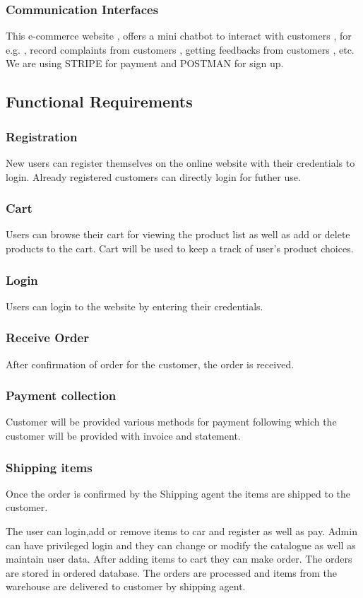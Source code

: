 \documentclass{article}
\begin{document}
\subsubsection{Communication Interfaces}
This e-commerce website , offers a mini chatbot to interact with customers , for e.g. , record complaints from customers , getting feedbacks from customers , etc. We are using STRIPE for payment and POSTMAN  for sign up.
\subsection{Functional Requirements}
\subsubsection{Registration}
New users can register themselves on the online website with their credentials to login. Already registered customers can directly login for futher use.
\subsubsection{Cart}
Users can browse their cart for  viewing the product list as well as add or delete products to the cart. Cart will be used to keep a track of user's product choices.
\subsubsection{Login}
Users can login to the website by entering their credentials.
\subsubsection{Receive Order}
After confirmation of order for the customer, the order is received.
\subsubsection{Payment collection}
Customer will be provided various methods for  payment following which the customer will be provided with invoice and statement.
\subsubsection{Shipping items}
Once the order is confirmed by the Shipping agent the items are shipped to the customer.

The user can login,add or remove items to car and register as well as pay. Admin can have privileged login and they can change or modify the catalogue as well as maintain user data. After adding items to cart they can make order. The orders are stored in ordered database. The orders are processed and items from the warehouse are delivered to customer by shipping agent.
\end{document}
